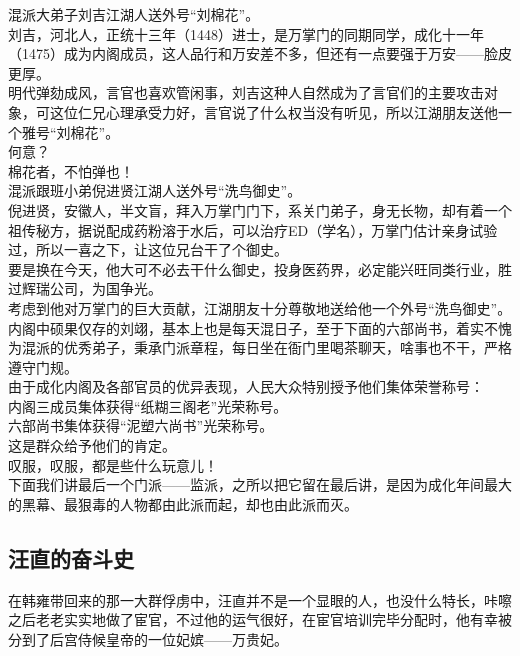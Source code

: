 \begin{multicols}{\theparacolNo}
混派大弟子刘吉江湖人送外号“刘棉花”。\\

刘吉，河北人，正统十三年（1448）进士，是万掌门的同期同学，成化十一年（1475）成为内阁成员，这人品行和万安差不多，但还有一点要强于万安——脸皮更厚。\\

明代弹劾成风，言官也喜欢管闲事，刘吉这种人自然成为了言官们的主要攻击对象，可这位仁兄心理承受力好，言官说了什么权当没有听见，所以江湖朋友送他一个雅号“刘棉花”。\\

何意？\\

棉花者，不怕弹也！\\

混派跟班小弟倪进贤江湖人送外号“洗鸟御史”。\\

倪进贤，安徽人，半文盲，拜入万掌门门下，系关门弟子，身无长物，却有着一个祖传秘方，据说配成药粉溶于水后，可以治疗ED（学名），万掌门估计亲身试验过，所以一喜之下，让这位兄台干了个御史。\\

要是换在今天，他大可不必去干什么御史，投身医药界，必定能兴旺同类行业，胜过辉瑞公司，为国争光。\\

考虑到他对万掌门的巨大贡献，江湖朋友十分尊敬地送给他一个外号“洗鸟御史”。\\

内阁中硕果仅存的刘翊，基本上也是每天混日子，至于下面的六部尚书，着实不愧为混派的优秀弟子，秉承门派章程，每日坐在衙门里喝茶聊天，啥事也不干，严格遵守门规。\\

由于成化内阁及各部官员的优异表现，人民大众特别授予他们集体荣誉称号：\\

内阁三成员集体获得“纸糊三阁老”光荣称号。\\

六部尚书集体获得“泥塑六尚书”光荣称号。\\

这是群众给予他们的肯定。\\

叹服，叹服，都是些什么玩意儿！\\

下面我们讲最后一个门派——监派，之所以把它留在最后讲，是因为成化年间最大的黑幕、最狠毒的人物都由此派而起，却也由此派而灭。\\

\subsection{汪直的奋斗史}
在韩雍带回来的那一大群俘虏中，汪直并不是一个显眼的人，也没什么特长，咔嚓之后老老实实地做了宦官，不过他的运气很好，在宦官培训完毕分配时，他有幸被分到了后宫侍候皇帝的一位妃嫔——万贵妃。\\


\end{multicols}
